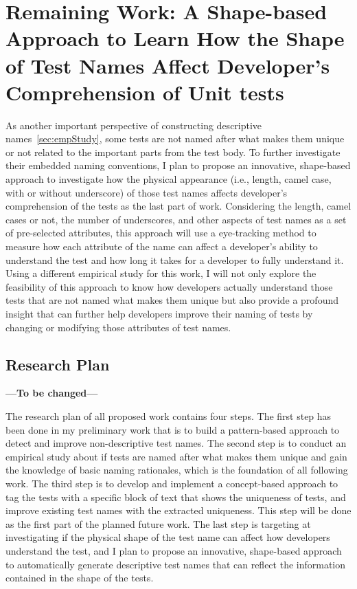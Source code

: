 \section{Remaining Work: A Shape-based Approach to Learn How the Shape of Test Names Affect Developer's Comprehension of Unit tests}
\label{sec:remaining-shape}

As another important perspective of constructing descriptive names~\cref{sec:empStudy}, some tests are not named after what makes them unique or not related to the important parts from the test body.
%
To further investigate their embedded naming conventions, I plan to propose an innovative, shape-based approach to investigate how the physical appearance (i.e., length, camel case, with or without underscore) of those test names affects developer's comprehension of the tests as the last part of work.
%
Considering the length, camel cases or not, the number of underscores, and other aspects of test names as a set of pre-selected attributes, this approach will use a eye-tracking method to measure how each attribute of the name can affect a developer's ability to understand the test and how long it takes for a developer to fully understand it.
%
Using a different empirical study for this work, I will not only explore the feasibility of this approach to know how developers actually understand those tests that are not named what makes them unique but also provide a profound insight that can further help developers improve their naming of tests by changing or modifying those attributes of test names.

\subsection{Research Plan}

\textbf{---To be changed---}

The research plan of all proposed work contains four steps.
%
The first step has been done in my preliminary work that is to build a pattern-based approach to detect and improve non-descriptive test names.
%
The second step is to conduct an empirical study about if tests are named after what makes them unique and gain the knowledge of basic naming rationales, which is the foundation of all following work.
%
The third step is to develop and implement a concept-based approach to tag the tests with a specific block of text that shows the uniqueness of tests, and improve existing test names with the extracted uniqueness.
%
This step will be done as the first part of the planned future work.
%
The last step is targeting at investigating if the physical shape of the test name can affect how developers understand the test, and I plan to propose an innovative, shape-based approach to automatically generate descriptive test names that can reflect the information contained in the shape of the tests.